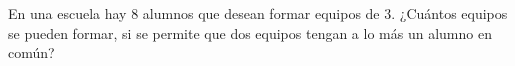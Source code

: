 En una escuela hay $8$ alumnos que desean formar equipos de $3$. ¿Cuántos equipos se pueden formar, si se permite que dos equipos tengan a lo más un alumno en común?